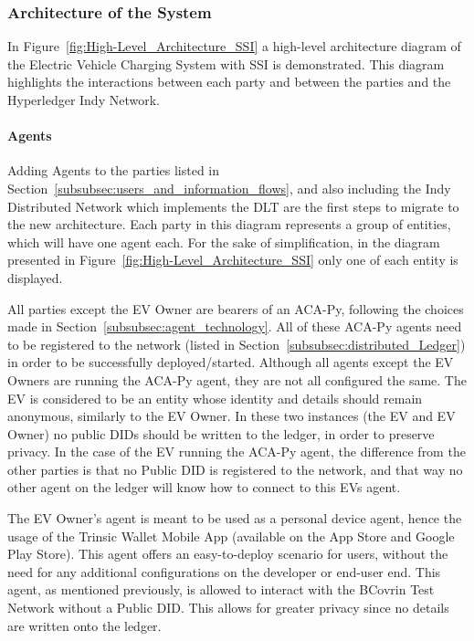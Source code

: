 \subsubsection{Architecture of the System}
\label{subsubsec:architecture_of_the_system}

In Figure~\ref{fig:High-Level_Architecture_SSI} a high-level architecture diagram of the Electric Vehicle Charging System with SSI is demonstrated. This diagram highlights the interactions between each party and between the parties and the Hyperledger Indy Network.

\paragraph{Agents}

Adding Agents to the parties listed in Section~\ref{subsubsec:users_and_information_flows}, and also including the Indy Distributed Network which implements the DLT are the first steps to migrate to the new architecture.
Each party in this diagram represents a group of entities, which will have one agent each. For the sake of simplification, in the diagram presented in Figure~\ref{fig:High-Level_Architecture_SSI} only one of each entity is displayed. 

All parties except the EV Owner are bearers of an ACA-Py, following the choices made in Section~\ref{subsubsec:agent_technology}. All of these ACA-Py agents need to be registered to the network (listed in Section~\ref{subsubsec:distributed_Ledger}) in order to be successfully deployed/started.
Although all agents except the EV Owners are running the ACA-Py agent, they are not all configured the same.
The EV is considered to be an entity whose identity and details should remain anonymous, similarly to the EV Owner. In these two instances (the EV and EV Owner) no public DIDs should be written to the ledger, in order to preserve privacy. 
In the case of the EV running the ACA-Py agent, the difference from the other parties is that no Public DID is registered to the network, and that way no other agent on the ledger will know how to connect to this EVs agent.

The EV Owner's agent is meant to be used as a personal device agent, hence the usage of the Trinsic Wallet Mobile App (available on the App Store and Google Play Store). This agent offers an easy-to-deploy scenario for users, without the need for any additional configurations on the developer or end-user end. This agent, as mentioned previously, is allowed to interact with the BCovrin Test Network without a Public DID. This allows for greater privacy since no details are written onto the ledger.

